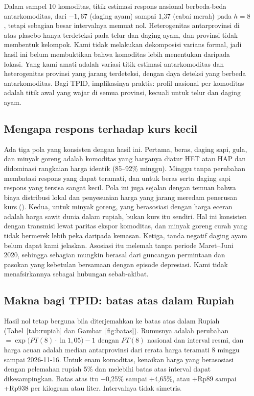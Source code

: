 \documentclass[11pt,a4paper]{article}
\makeatletter
\newcommand{\kg@one}[2]{\ifcsdef{#1@#2}{\csuse{#1@#2}}{\textbf{??#2}\PackageWarning{kagami}{Rujukan tak dikenal: #2}}}
\newcommand{\kg@item}[1]{\kg@sep\kg@one{refp}{#1}\def\kg@sep{; }}
\newcommand{\citep}[1]{\begingroup\def\kg@sep{}(\forcsvlist{\kg@item}{#1})\endgroup}
\makeatother
\begin{document}
Dalam sampel 10 komoditas, titik estimasi respons nasional berbeda-beda antarkomoditas, dari $-1,67$ (daging ayam) sampai 1,37
(cabai merah) pada $h=8$, tetapi sebagian besar intervalnya memuat nol. Heterogenitas antarprovinsi di atas plasebo hanya terdeteksi
pada telur dan daging ayam, dan provinsi tidak membentuk kelompok. Kami tidak melakukan dekomposisi varians formal, jadi hasil ini
belum membuktikan bahwa komoditas lebih menentukan daripada lokasi. Yang kami amati adalah variasi titik estimasi antarkomoditas dan
heterogenitas provinsi yang jarang terdeteksi, dengan daya deteksi yang berbeda antarkomoditas. Bagi TPID, implikasinya praktis:
profil nasional per komoditas adalah titik awal yang wajar di semua provinsi, kecuali untuk telur dan daging ayam.

\subsection{Mengapa respons terhadap kurs kecil}

Ada tiga pola yang konsisten dengan hasil ini. Pertama, beras, daging sapi, gula, dan minyak goreng adalah komoditas yang harganya
diatur HET atau HAP dan didominasi rangkaian harga identik (85–92\% minggu). Minggu tanpa perubahan membatasi respons yang dapat
teramati, dan untuk beras serta daging sapi respons yang tersisa sangat kecil. Pola ini juga sejalan dengan temuan bahwa biaya distribusi lokal dan penyesuaian
harga yang jarang meredam penerusan kurs \citep{burstein2003,campa2010,gopinath2010}. Kedua, untuk minyak goreng, yang berasosiasi
dengan harga eceran adalah harga sawit dunia dalam rupiah, bukan kurs itu sendiri. Hal ini konsisten dengan transmisi lewat paritas
ekspor komoditas, dan minyak goreng curah yang tidak bermerek lebih peka daripada kemasan. Ketiga, tanda negatif daging ayam belum
dapat kami jelaskan. Asosiasi itu melemah tanpa periode Maret–Juni 2020, sehingga sebagian mungkin berasal dari guncangan permintaan
dan pasokan yang kebetulan bersamaan dengan episode depresiasi. Kami tidak menafsirkannya sebagai hubungan sebab-akibat.

\subsection{Makna bagi TPID: batas atas dalam Rupiah}

Hasil nol tetap berguna bila diterjemahkan ke batas atas dalam Rupiah (Tabel~\ref{tab:rupiah} dan Gambar~\ref{fig:batas}). Rumusnya
adalah perubahan $= \exp\!\big(PT(8)\cdot \ln 1,05\big) - 1$ dengan $PT(8)$ nasional dan interval resmi, dan harga acuan adalah median
antarprovinsi dari rerata harga teramati 8 minggu sampai 2026-11-16. Untuk enam komoditas, kenaikan harga yang berasosiasi dengan
pelemahan rupiah 5\% dan melebihi batas atas interval dapat dikesampingkan. Batas atas itu +0,25\% sampai +4,65\%, atau +Rp89 sampai
+Rp938 per kilogram atau liter. Intervalnya tidak simetris.
\end{document}
